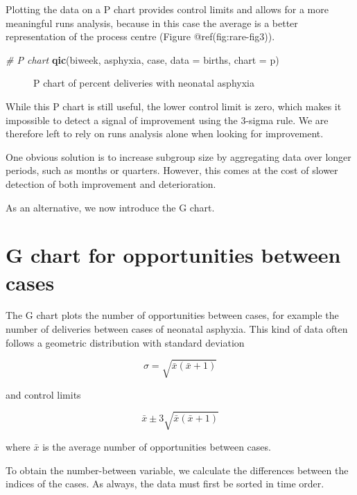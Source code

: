 \documentclass[
]{book}
\makeatletter
\newenvironment{Shaded}{\begin{snugshade}}{\end{snugshade}}
\newcommand{\AttributeTok}[1]{\textcolor[rgb]{0.13,0.29,0.53}{#1}}
\newcommand{\CommentTok}[1]{\textcolor[rgb]{0.56,0.35,0.01}{\textit{#1}}}
\newcommand{\FunctionTok}[1]{\textcolor[rgb]{0.13,0.29,0.53}{\textbf{#1}}}
\newcommand{\NormalTok}[1]{#1}
\newcommand{\StringTok}[1]{\textcolor[rgb]{0.31,0.60,0.02}{#1}}
\newcommand*\pandocbounded[1]{%
  \sbox\pandoc@box{#1}%
  \Gscale@div\@tempa{\textheight}{\dimexpr\ht\pandoc@box+\dp\pandoc@box\relax}%
  \Gscale@div\@tempb{\linewidth}{\wd\pandoc@box}%
  \ifdim\@tempb\p@<\@tempa\p@\let\@tempa\@tempb\fi%
  \ifdim\@tempa\p@<\p@\scalebox{\@tempa}{\usebox\pandoc@box}%
  \else\usebox{\pandoc@box}%
  \fi%
}
\makeatother
\begin{document}
Plotting the data on a P chart provides control limits and allows for a
more meaningful runs analysis, because in this case the average is a
better representation of the process centre (Figure
@ref(fig:rare-fig3)).

\begin{Shaded}
\begin{Highlighting}[]
\CommentTok{\# P chart}
\FunctionTok{qic}\NormalTok{(biweek, asphyxia, case, }
    \AttributeTok{data  =}\NormalTok{ births, }
    \AttributeTok{chart =} \StringTok{\textquotesingle{}p\textquotesingle{}}\NormalTok{)}
\end{Highlighting}
\end{Shaded}

\begin{figure}
\centering
\pandocbounded{}
\caption{P chart of percent deliveries with neonatal asphyxia}
\end{figure}

While this P chart is still useful, the lower control limit is zero,
which makes it impossible to detect a signal of improvement using the
3-sigma rule. We are therefore left to rely on runs analysis alone when
looking for improvement.

One obvious solution is to increase subgroup size by aggregating data
over longer periods, such as months or quarters. However, this comes at
the cost of slower detection of both improvement and deterioration.

As an alternative, we now introduce the G chart.

\section{G chart for opportunities between
cases}\label{g-chart-for-opportunities-between-cases}

The G chart plots the number of opportunities between cases, for example
the number of deliveries between cases of neonatal asphyxia. This kind
of data often follows a geometric distribution with standard deviation

\[\sigma = \sqrt{\bar{x}(\bar{x}+1)}\]

and control limits

\[\bar{x}\pm3\sqrt{\bar{x}(\bar{x}+1)}\]

where \(\bar{x}\) is the average number of opportunities between cases.

To obtain the number-between variable, we calculate the differences
between the indices of the cases. As always, the data must first be
sorted in time order.
\end{document}
